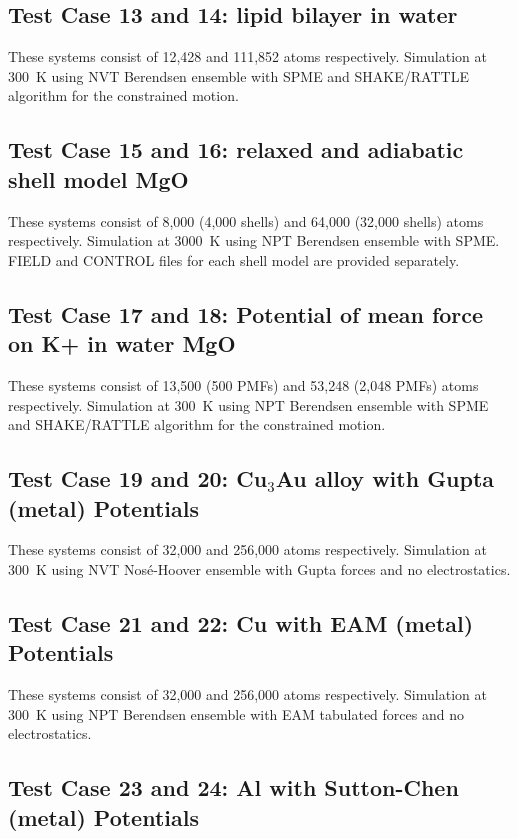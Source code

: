 \subsection{Test Case 13 and 14: lipid bilayer in water}

These systems consist of 12,428 and 111,852 atoms respectively.
Simulation at 300~K using NVT Berendsen ensemble with SPME and
SHAKE/RATTLE algorithm for the constrained motion.

\subsection{Test Case 15 and 16: relaxed and adiabatic shell model MgO}

These systems consist of 8,000 (4,000 shells) and 64,000 (32,000
shells) atoms respectively.  Simulation at 3000~K using NPT
Berendsen ensemble with SPME.  FIELD and CONTROL files for each
shell model are provided separately.

\subsection{Test Case 17 and 18: Potential of mean force on K+ in water MgO}

These systems consist of 13,500 (500 PMFs) and 53,248 (2,048 PMFs)
atoms respectively.  Simulation at 300~K using NPT Berendsen
ensemble with SPME and SHAKE/RATTLE algorithm for the constrained
motion.

\subsection{Test Case 19 and 20: Cu$_{3}$Au alloy with Gupta (metal) Potentials}

These systems consist of 32,000 and 256,000 atoms respectively.
Simulation at 300~K using NVT Nos\'e-Hoover ensemble with Gupta forces and
no electrostatics.

\subsection{Test Case 21 and 22: Cu with EAM (metal) Potentials}

These systems consist of 32,000 and 256,000 atoms respectively.
Simulation at 300~K using NPT Berendsen ensemble with EAM tabulated
forces and no electrostatics.

\subsection{Test Case 23 and 24: Al with Sutton-Chen (metal) Potentials}

